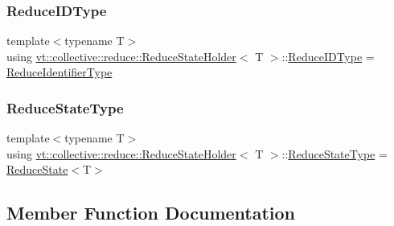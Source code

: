 \subsubsection{\texorpdfstring{Reduce\+I\+D\+Type}{ReduceIDType}}
{\footnotesize\ttfamily template$<$typename T$>$ \\
using \hyperlink{structvt_1_1collective_1_1reduce_1_1_reduce_state_holder}{vt\+::collective\+::reduce\+::\+Reduce\+State\+Holder}$<$ T $>$\+::\hyperlink{structvt_1_1collective_1_1reduce_1_1_reduce_state_holder_a783eeed6422fcc71cea89deca5ed8f08}{Reduce\+I\+D\+Type} =  \hyperlink{namespacevt_1_1collective_1_1reduce_ad688d164ad18b2011198cbc97cc84b74}{Reduce\+Identifier\+Type}}

\mbox{\label{structvt_1_1collective_1_1reduce_1_1_reduce_state_holder_a6333d237936c835115b19a7421edf6ec}} 
\subsubsection{\texorpdfstring{Reduce\+State\+Type}{ReduceStateType}}
{\footnotesize\ttfamily template$<$typename T$>$ \\
using \hyperlink{structvt_1_1collective_1_1reduce_1_1_reduce_state_holder}{vt\+::collective\+::reduce\+::\+Reduce\+State\+Holder}$<$ T $>$\+::\hyperlink{structvt_1_1collective_1_1reduce_1_1_reduce_state_holder_a6333d237936c835115b19a7421edf6ec}{Reduce\+State\+Type} =  \hyperlink{structvt_1_1collective_1_1reduce_1_1_reduce_state}{Reduce\+State}$<$T$>$}



\subsection{Member Function Documentation}
\mbox{\label{structvt_1_1collective_1_1reduce_1_1_reduce_state_holder_a7b17dcd1d3d44b97078a316839e28d3d}} 
